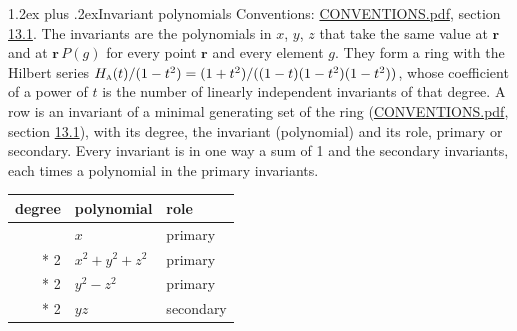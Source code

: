 \documentclass[10pt,a4paper]{article}
\makeatletter
\renewcommand\section{\@startsection{section}{1}{\z@}{-3ex plus -1ex minus -.2ex}%
  {1.2ex plus .2ex}{\normalfont\large\sffamily\bfseries\color{parttitle}}}
\numberwithin{equation}{section}
\newcommand{\irr}[1]{\text{\normalfont\scshape #1}}
\newcommand{\pointr}{\mathbf{r}}
\makeatother
\begin{document}
\section{Invariant polynomials}\label{s:invariant_polynomials}
Conventions: \href{../../CONVENTIONS.pdf}{CONVENTIONS.pdf}, section \href{../../CONVENTIONS.pdf\#conv.13.1}{13.1}.
The invariants are the polynomials in $x$, $y$, $z$ that take the same value at $\pointr$ and at $\pointr\,P(g)$ for every point $\pointr$ and every element $g$. They form a ring with the Hilbert series $H_{\irr{a}}(t)/(1-t^{2}) = (1 + t^{2})/((1-t)(1-t^{2})(1-t^{2}))$, whose coefficient of a power of $t$ is the number of linearly independent invariants of that degree. \label{n:head.degree}\label{n:head.role}A row is an invariant of a minimal generating set of the ring (\href{../../CONVENTIONS.pdf}{CONVENTIONS.pdf}, section \href{../../CONVENTIONS.pdf\#conv.13.1}{13.1}), with its degree, the invariant (polynomial) and its role, primary or secondary. Every invariant is in one way a sum of 1 and the secondary invariants, each times a polynomial in the primary invariants.
{\small\begin{longtable}{@{}rll@{}}\toprule
degree & polynomial & role\\\midrule\endhead
\bottomrule\endfoot\endlastfoot
1 & $x$ & primary\\*
2 & $x^{2} + y^{2} + z^{2}$ & primary\\*
2 & $y^{2} - z^{2}$ & primary\\*
2 & $yz$ & secondary\\
\bottomrule\end{longtable}}
\end{document}
